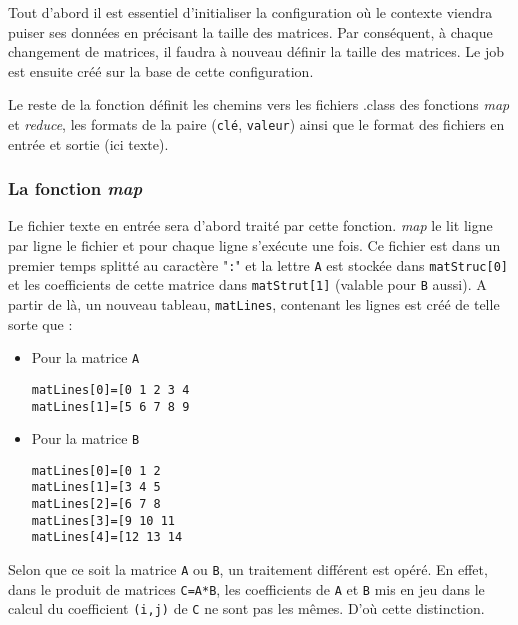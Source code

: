 \par Tout d'abord il est essentiel d'initialiser la configuration où le contexte viendra puiser ses données en précisant la taille des matrices. Par conséquent, à chaque changement de matrices, il faudra à nouveau définir la taille des matrices. Le job est ensuite créé sur la base de cette configuration.

\par Le reste de la fonction définit les chemins vers les fichiers .class des fonctions \emph{map} et \emph{reduce}, les formats de la paire (\texttt{clé}, \texttt{valeur}) ainsi que le format des fichiers en entrée et sortie (ici texte).
  
\subsubsection{La fonction \emph{map}}

\par Le fichier texte en entrée sera d'abord traité par cette fonction. \emph{map} le lit ligne par ligne le fichier et pour chaque ligne s'exécute une fois. Ce fichier est dans un premier temps splitté au caractère "\texttt{:}" et la lettre \texttt{A} est stockée dans \texttt{matStruc[0]} et les coefficients de cette matrice dans \texttt{matStrut[1]} (valable pour \texttt{B} aussi). A partir de là, un nouveau tableau, \texttt{matLines}, contenant les lignes est créé de telle sorte que :
\begin{itemize}
\item Pour la matrice \texttt{A} \medskip

\begin{verbatim}
matLines[0]=[0 1 2 3 4
matLines[1]=[5 6 7 8 9
\end{verbatim}
\medskip

\item Pour la matrice \texttt{B} \medskip

\begin{verbatim}
matLines[0]=[0 1 2
matLines[1]=[3 4 5
matLines[2]=[6 7 8
matLines[3]=[9 10 11
matLines[4]=[12 13 14
\end{verbatim}
\medskip

\end{itemize}

\par Selon que ce soit la matrice \texttt{A} ou \texttt{B}, un traitement différent est opéré. En effet, dans le produit de matrices \texttt{C=A*B}, les coefficients de \texttt{A} et \texttt{B} mis en jeu dans le calcul du coefficient \texttt{(i,j)} de \texttt{C} ne sont pas les mêmes. D'où cette distinction.

